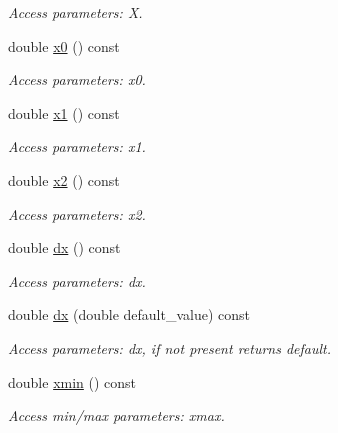 \begin{DoxyCompactItemize}
\begin{DoxyCompactList}\small\item\em Access parameters: X. \item\end{DoxyCompactList}\item 
double \hyperlink{struct_d_d4hep_1_1_x_m_l_1_1_child_value_a0d67f5159d98e5ff7d2598d82628bd70}{x0} () const 
\begin{DoxyCompactList}\small\item\em Access parameters: x0. \item\end{DoxyCompactList}\item 
double \hyperlink{struct_d_d4hep_1_1_x_m_l_1_1_child_value_a165161751d77ddb7834f2432a201edfb}{x1} () const 
\begin{DoxyCompactList}\small\item\em Access parameters: x1. \item\end{DoxyCompactList}\item 
double \hyperlink{struct_d_d4hep_1_1_x_m_l_1_1_child_value_a4dfd144819bbe7e5fd731b82a2787fe7}{x2} () const 
\begin{DoxyCompactList}\small\item\em Access parameters: x2. \item\end{DoxyCompactList}\item 
double \hyperlink{struct_d_d4hep_1_1_x_m_l_1_1_child_value_a8f9adc2c67d7a6302de9521ee96b0025}{dx} () const 
\begin{DoxyCompactList}\small\item\em Access parameters: dx. \item\end{DoxyCompactList}\item 
double \hyperlink{struct_d_d4hep_1_1_x_m_l_1_1_child_value_aa178250bd933dbca509291b59325c690}{dx} (double default\_\-value) const 
\begin{DoxyCompactList}\small\item\em Access parameters: dx, if not present returns default. \item\end{DoxyCompactList}\item 
double \hyperlink{struct_d_d4hep_1_1_x_m_l_1_1_child_value_ad7adca8ba6e98179eb8265ad2dfa8e5d}{xmin} () const 
\begin{DoxyCompactList}\small\item\em Access min/max parameters: xmax. \item\end{DoxyCompactList}\item 

\end{DoxyCompactItemize}
